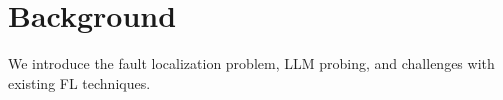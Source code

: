 \section{Background}
\label{sec:probing}
We introduce the fault localization problem, LLM probing, and challenges with existing FL techniques.






% 

